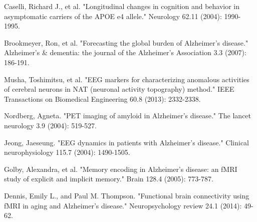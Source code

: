 \documentclass[preprint,12pt]{elsarticle}
\begin{document}
	
	
	\begin{thebibliography}{1}
		
		Caselli, Richard J., et al. "Longitudinal changes in cognition and behavior in asymptomatic carriers of the APOE e4 allele." Neurology 62.11 (2004): 1990-1995.
		
		Brookmeyer, Ron, et al. "Forecasting the global burden of Alzheimer’s disease." Alzheimer's \& dementia: the journal of the Alzheimer's Association 3.3 (2007): 186-191.
		
		Musha, Toshimitsu, et al. "EEG markers for characterizing anomalous activities of cerebral neurons in NAT (neuronal activity topography) method." IEEE Transactions on Biomedical Engineering 60.8 (2013): 2332-2338.
		
		Nordberg, Agneta. "PET imaging of amyloid in Alzheimer's disease." The lancet neurology 3.9 (2004): 519-527.
		
		Jeong, Jaeseung. "EEG dynamics in patients with Alzheimer's disease." Clinical neurophysiology 115.7 (2004): 1490-1505.
		
		Golby, Alexandra, et al. "Memory encoding in Alzheimer's disease: an fMRI study of explicit and implicit memory." Brain 128.4 (2005): 773-787.
		
		
		
		
		Dennis, Emily L., and Paul M. Thompson. "Functional brain connectivity using fMRI in aging and Alzheimer’s disease." Neuropsychology review 24.1 (2014): 49-62.
		
		
		

\end{thebibliography}
\end{document}
